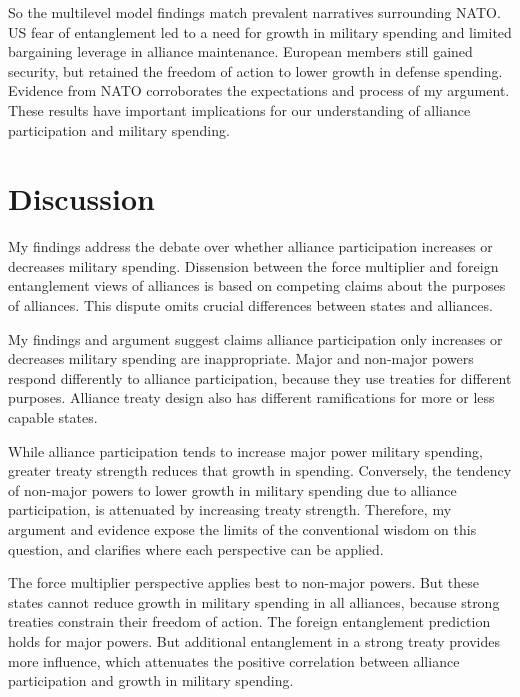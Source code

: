 \documentclass[12pt]{article}
\begin{document}
So the multilevel model findings match prevalent narratives surrounding NATO.
US fear of entanglement led to a need for growth in military spending and limited bargaining leverage in alliance maintenance. 
European members still gained security, but retained the freedom of action to lower growth in defense spending.   
Evidence from NATO corroborates the expectations and process of my argument. 
These results have important implications for our understanding of alliance participation and military spending. 


\section{Discussion}


My findings address the debate over whether alliance participation increases or decreases military spending. 
Dissension between the force multiplier and foreign entanglement views of alliances is based on competing claims about the purposes of alliances. 
This dispute omits crucial differences between states and alliances. 


My findings and argument suggest claims alliance participation only increases or decreases military spending are inappropriate. 
Major and non-major powers respond differently to alliance participation, because they use treaties for different purposes. 
Alliance treaty design also has different ramifications for more or less capable states. 


While alliance participation tends to increase major power military spending, greater treaty strength reduces that growth in spending. 
Conversely, the tendency of non-major powers to lower growth in military spending due to alliance participation, is attenuated by increasing treaty strength. 
Therefore, my argument and evidence expose the limits of the conventional wisdom on this question, and clarifies where each perspective can be applied. 


The force multiplier perspective applies best to non-major powers. 
But these states cannot reduce growth in military spending in all alliances, because strong treaties constrain their freedom of action.
The foreign entanglement prediction holds for major powers. 
But additional entanglement in a strong treaty provides more influence, which attenuates the positive correlation between alliance participation and growth in military spending. 
\end{document}
